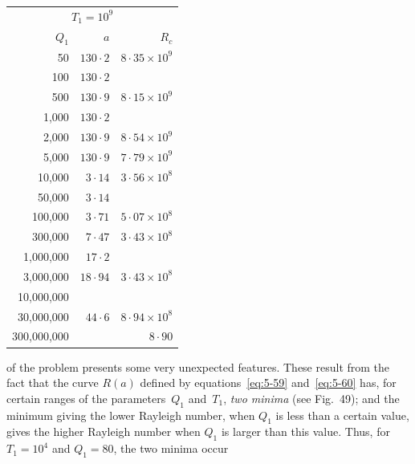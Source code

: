 \begin{table}[p]
\bigskip
\begin{tabular}{r@{\quad}r@{\quad}r}
\hline
\multicolumn{3}{c}{$T_1 = 10^{9}$} \\
$Q_1$ & $a$ & $R_c$ \\
\hline
 50   & $130{\cdot}2$  & $8{\cdot}35\times10^{9}$ \\
 100  & $130{\cdot}2$  &           \\
 500  & $130{\cdot}9$  & $8{\cdot}15\times10^{9}$ \\
 1{,}000 & $130{\cdot}2$  &       \\
 2{,}000 & $130{\cdot}9$  & $8{\cdot}54\times10^{9}$ \\
 5{,}000 & $130{\cdot}9$ & $7{\cdot}79\times10^{9}$ \\
 10{,}000 & $3{\cdot}14$  & $3{\cdot}56\times10^{8}$\\
 50{,}000 & $3{\cdot}14$  &       \\
 100{,}000 & $3{\cdot}71$ & $5{\cdot}07\times10^{8}$ \\
 300{,}000 & $7{\cdot}47$ & $3{\cdot}43\times10^{8}$ \\
 1{,}000{,}000 & $17{\cdot}2$  &  \\
 3{,}000{,}000 & $18{\cdot}94$ & $3{\cdot}43\times10^{8}$ \\
 10{,}000{,}000 &             &   \\
 30{,}000{,}000 & $44{\cdot}6$ & $8{\cdot}94\times10^{8}$ \\
 300{,}000{,}000 &              & $8{\cdot}90$  \\
\hline
\end{tabular}
\end{table}



of the problem presents some very unexpected features.  These result from
the fact that the curve $R(a)$ defined by equations~\eqref{eq:5-59}
and~\eqref{eq:5-60} has, for certain ranges of the parameters~$Q_1$
and~$T_1$, \emph{two minima} (see Fig.~49); and the minimum giving the lower
Rayleigh number, when $Q_1$ is less than a certain value, gives the higher
Rayleigh number when $Q_1$ is larger than this value.  Thus, for
$T_1 = 10^{4}$ and $Q_1 = 80$, the two minima occur

